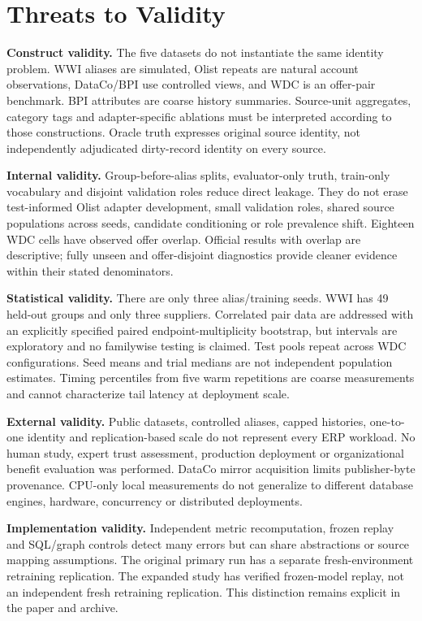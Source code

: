\documentclass[11pt,letterpaper]{article}
\begin{document}
\section{Threats to Validity}
\textbf{Construct validity.} The five datasets do not instantiate the same identity problem. WWI aliases are simulated, Olist repeats are natural account observations, DataCo/BPI use controlled views, and WDC is an offer-pair benchmark. BPI attributes are coarse history summaries. Source-unit aggregates, category tags and adapter-specific ablations must be interpreted according to those constructions. Oracle truth expresses original source identity, not independently adjudicated dirty-record identity on every source.

\textbf{Internal validity.} Group-before-alias splits, evaluator-only truth, train-only vocabulary and disjoint validation roles reduce direct leakage. They do not erase test-informed Olist adapter development, small validation roles, shared source populations across seeds, candidate conditioning or role prevalence shift. Eighteen WDC cells have observed offer overlap. Official results with overlap are descriptive; fully unseen and offer-disjoint diagnostics provide cleaner evidence within their stated denominators.

\textbf{Statistical validity.} There are only three alias/training seeds. WWI has 49 held-out groups and only three suppliers. Correlated pair data are addressed with an explicitly specified paired endpoint-multiplicity bootstrap, but intervals are exploratory and no familywise testing is claimed. Test pools repeat across WDC configurations. Seed means and trial medians are not independent population estimates. Timing percentiles from five warm repetitions are coarse measurements and cannot characterize tail latency at deployment scale.

\textbf{External validity.} Public datasets, controlled aliases, capped histories, one-to-one identity and replication-based scale do not represent every ERP workload. No human study, expert trust assessment, production deployment or organizational benefit evaluation was performed. DataCo mirror acquisition limits publisher-byte provenance. CPU-only local measurements do not generalize to different database engines, hardware, concurrency or distributed deployments.

\textbf{Implementation validity.} Independent metric recomputation, frozen replay and SQL/graph controls detect many errors but can share abstractions or source mapping assumptions. The original primary run has a separate fresh-environment retraining replication. The expanded study has verified frozen-model replay, not an independent fresh retraining replication. This distinction remains explicit in the paper and archive.
\end{document}
